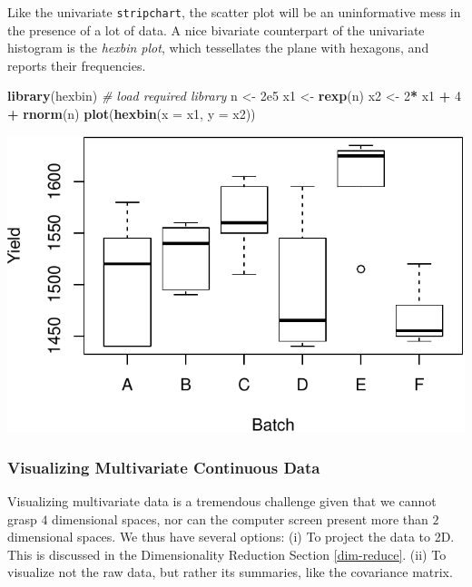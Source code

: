 \documentclass[]{book}
\newenvironment{Shaded}{\begin{snugshade}}{\end{snugshade}}
\newcommand{\KeywordTok}[1]{\textcolor[rgb]{0.13,0.29,0.53}{\textbf{#1}}}
\newcommand{\DataTypeTok}[1]{\textcolor[rgb]{0.13,0.29,0.53}{#1}}
\newcommand{\DecValTok}[1]{\textcolor[rgb]{0.00,0.00,0.81}{#1}}
\newcommand{\FloatTok}[1]{\textcolor[rgb]{0.00,0.00,0.81}{#1}}
\newcommand{\StringTok}[1]{\textcolor[rgb]{0.31,0.60,0.02}{#1}}
\newcommand{\CommentTok}[1]{\textcolor[rgb]{0.56,0.35,0.01}{\textit{#1}}}
\newcommand{\OperatorTok}[1]{\textcolor[rgb]{0.81,0.36,0.00}{\textbf{#1}}}
\newcommand{\NormalTok}[1]{#1}
\theoremstyle{definition}
\theoremstyle{definition}
\theoremstyle{definition}
\theoremstyle{remark}
\begin{document}
Like the univariate \texttt{stripchart}, the scatter plot will be an
uninformative mess in the presence of a lot of data. A nice bivariate
counterpart of the univariate histogram is the \emph{hexbin plot}, which
tessellates the plane with hexagons, and reports their frequencies.

\begin{Shaded}
\begin{Highlighting}[]
\KeywordTok{library}\NormalTok{(hexbin) }\CommentTok{# load required library}
\NormalTok{n <-}\StringTok{ }\FloatTok{2e5}
\NormalTok{x1 <-}\StringTok{ }\KeywordTok{rexp}\NormalTok{(n)}
\NormalTok{x2 <-}\StringTok{ }\DecValTok{2}\OperatorTok{*}\StringTok{ }\NormalTok{x1 }\OperatorTok{+}\StringTok{ }\DecValTok{4} \OperatorTok{+}\StringTok{ }\KeywordTok{rnorm}\NormalTok{(n)}
\KeywordTok{plot}\NormalTok{(}\KeywordTok{hexbin}\NormalTok{(}\DataTypeTok{x =}\NormalTok{ x1, }\DataTypeTok{y =}\NormalTok{ x2))}
\end{Highlighting}
\end{Shaded}

\includegraphics[width=0.5\linewidth]{Rcourse_files/figure-latex/unnamed-chunk-142-1}

\subsubsection{Visualizing Multivariate Continuous
Data}\label{visualizing-multivariate-continuous-data}

Visualizing multivariate data is a tremendous challenge given that we
cannot grasp \(4\) dimensional spaces, nor can the computer screen
present more than \(2\) dimensional spaces. We thus have several
options: (i) To project the data to 2D. This is discussed in the
Dimensionality Reduction Section \ref{dim-reduce}. (ii) To visualize not
the raw data, but rather its summaries, like the covariance matrix.
\end{document}
